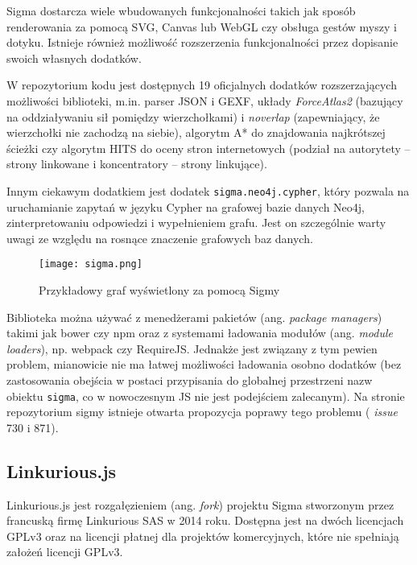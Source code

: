 Sigma dostarcza wiele wbudowanych funkcjonalności takich jak sposób renderowania za pomocą SVG, Canvas lub WebGL czy obsługa gestów myszy i dotyku. Istnieje również możliwość rozszerzenia funkcjonalności przez dopisanie swoich własnych dodatków. 

W repozytorium kodu jest dostępnych 19 oficjalnych dodatków rozszerzających możliwości biblioteki, m.in. parser JSON i GEXF, układy \textit{ForceAtlas2} (bazujący na oddziaływaniu sił pomiędzy wierzchołkami) i \textit{noverlap} (zapewniający, że wierzchołki nie zachodzą na siebie), algorytm A* do znajdowania najkrótszej ścieżki czy algorytm HITS do oceny stron internetowych (podział na autorytety -- strony linkowane i koncentratory -- strony linkujące). 

Innym ciekawym dodatkiem jest dodatek \texttt{sigma.neo4j.cypher}, który pozwala na uruchamianie zapytań w języku Cypher na grafowej bazie danych Neo4j, zinterpretowaniu odpowiedzi i wypełnieniem grafu. Jest on szczególnie warty uwagi ze względu na rosnące znaczenie grafowych baz danych. 

\bigskip

\begin{figure}[H]
\centering
\texttt{[image: sigma.png]}
\captionsetup{justification=centering}
\caption{Przykładowy graf wyświetlony za pomocą Sigmy}\label{fig:cytoscape}
\end{figure}

\bigskip

Biblioteka można używać z menedżerami pakietów (ang. \textit{package managers}) takimi jak bower czy npm oraz z systemami ładowania modułów (ang. \textit{module loaders}), np. webpack czy RequireJS. Jednakże jest związany z tym pewien problem, mianowicie nie ma łatwej możliwości ładowania osobno dodatków (bez zastosowania obejścia w postaci przypisania do globalnej przestrzeni nazw obiektu \texttt{sigma}, co w nowoczesnym JS nie jest podejściem zalecanym). Na stronie repozytorium sigmy istnieje otwarta propozycja poprawy tego problemu (\cite{sigma-repo} \textit{issue} 730 i 871).


\subsection{Linkurious.js}

Linkurious.js jest rozgałęzieniem (ang. \textit{fork}) projektu Sigma stworzonym przez francuską firmę Linkurious SAS w 2014 roku. Dostępna jest na dwóch licencjach GPLv3 oraz na licencji płatnej dla projektów komercyjnych, które nie spełniają założeń licencji GPLv3. 

